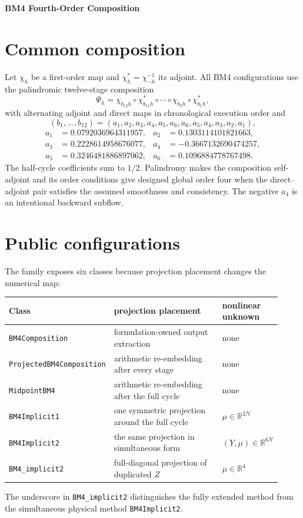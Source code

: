 \documentclass[11pt,a4paper]{article}
\newcommand{\R}{\mathbb{R}}
\begin{document}
\begin{center}
 {\LARGE\bfseries\color{gcblue}BM4 Fourth-Order Composition}\par
 \vspace{0.35em}{\large Direct--adjoint splitting and all projection configurations}
\end{center}

\section{Common composition}

Let $\chi_h$ be a first-order map and $\chi_h^*=\chi_{-h}^{-1}$ its adjoint.
All BM4 configurations use the palindromic twelve-stage composition
\[
\Psi_h=\chi_{b_{12}h}\circ\chi^*_{b_{11}h}\circ\cdots
\circ\chi_{b_2h}\circ\chi^*_{b_1h},
\]
with alternating adjoint and direct maps in chronological execution order and
\[
(b_1,\ldots,b_{12})=(a_1,a_2,a_3,a_4,a_5,a_6,a_6,a_5,a_4,a_3,a_2,a_1),
\]
\begin{align*}
a_1&=0.0792036964311957,&a_2&=0.1303114101821663,\\
a_3&=0.2228614958676077,&a_4&=-0.3667132690474257,\\
a_5&=0.3246481886897062,&a_6&=0.1096884778767498.
\end{align*}
The half-cycle coefficients sum to $1/2$.  Palindromy makes the composition
self-adjoint and its order conditions give designed global order four when the
direct--adjoint pair satisfies the assumed smoothness and consistency.  The
negative $a_4$ is an intentional backward subflow.

\section{Public configurations}

The family exposes six classes because projection placement changes the
numerical map:
\begin{center}
\small
\begin{tabular}{@{}p{0.27\linewidth}p{0.48\linewidth}p{0.17\linewidth}@{}}
\toprule
Class & projection placement & nonlinear unknown\\
\midrule
\texttt{BM4Composition} & formulation-owned output extraction & none\\
\texttt{ProjectedBM4}\allowbreak\texttt{Composition} & arithmetic re-embedding after every stage & none\\
\texttt{MidpointBM4} & arithmetic re-embedding after the full cycle & none\\
\texttt{BM4Implicit1} & one symmetric projection around the full cycle & $\mu\in\R^{2N}$\\
\texttt{BM4Implicit2} & the same projection in simultaneous form & $(Y,\mu)\in\R^{6N}$\\
\texttt{BM4\_implicit2} & full-diagonal projection of duplicated $Z$ & $\mu\in\R^4$\\
\bottomrule
\end{tabular}
\end{center}
The underscore in \texttt{BM4\_implicit2} distinguishes the fully extended
method from the simultaneous physical method \texttt{BM4Implicit2}.
\end{document}
